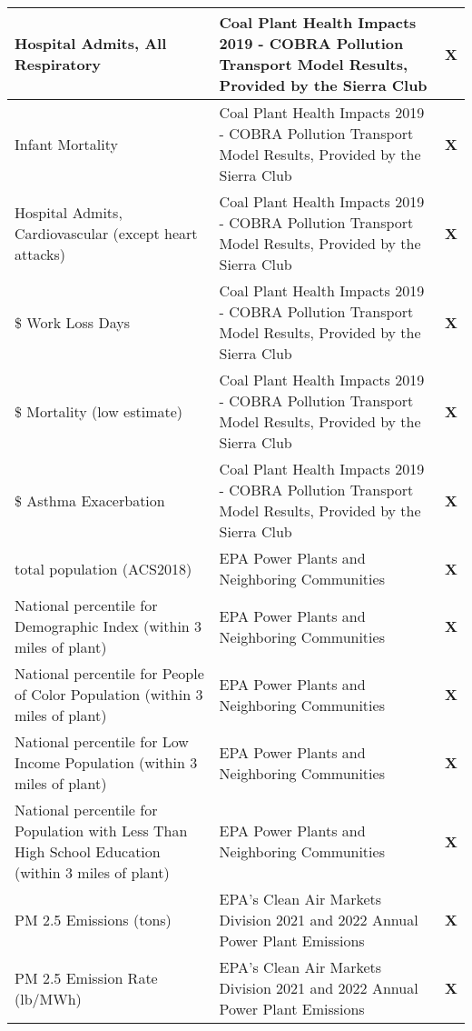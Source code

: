 \begin{table}[H]
\begin{adjustbox}{width=\textwidth}
\begin{tabular}{|l | l | l |}
        \midrule
        Hospital Admits, All Respiratory & Coal Plant Health Impacts 2019 - COBRA Pollution Transport Model Results, Provided by the Sierra Club & \textbf{X} \\
        \midrule
        Infant Mortality & Coal Plant Health Impacts 2019 - COBRA Pollution Transport Model Results, Provided by the Sierra Club & \textbf{X} \\
        \midrule
        Hospital Admits, Cardiovascular (except heart attacks) & Coal Plant Health Impacts 2019 - COBRA Pollution Transport Model Results, Provided by the Sierra Club & \textbf{X} \\
        \midrule
        \$ Work Loss Days & Coal Plant Health Impacts 2019 - COBRA Pollution Transport Model Results, Provided by the Sierra Club & \textbf{X} \\
        \midrule
        \$ Mortality (low estimate) & Coal Plant Health Impacts 2019 - COBRA Pollution Transport Model Results, Provided by the Sierra Club & \textbf{X} \\
        \midrule
        \$ Asthma Exacerbation & Coal Plant Health Impacts 2019 - COBRA Pollution Transport Model Results, Provided by the Sierra Club & \textbf{X} \\
        \midrule
        total population (ACS2018) & EPA Power Plants and Neighboring Communities & \textbf{X} \\
        \midrule
        National percentile for Demographic Index (within 3 miles of plant) & EPA Power Plants and Neighboring Communities & \textbf{X} \\
        \midrule
        National percentile for People of Color Population (within 3 miles of plant) & EPA Power Plants and Neighboring Communities & \textbf{X} \\
        \midrule
        National percentile for Low Income Population (within 3 miles of plant) & EPA Power Plants and Neighboring Communities & \textbf{X} \\
        \midrule
        National percentile for Population with Less Than High School Education (within 3 miles of plant) & EPA Power Plants and Neighboring Communities & \textbf{X} \\
        \midrule
        PM 2.5 Emissions (tons) & EPA's Clean Air Markets Division 2021 and 2022 Annual Power Plant Emissions & \textbf{X} \\
        \midrule
        PM 2.5 Emission Rate (lb/MWh) & EPA's Clean Air Markets Division 2021 and 2022 Annual Power Plant Emissions & \textbf{X} \\

\end{tabular}
\end{adjustbox}
\end{table}
